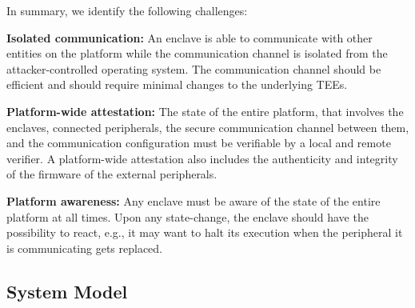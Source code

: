 In summary, we identify the following challenges:

\begin{mylist}

  \item \textbf{Isolated communication:} An enclave is able to communicate with other entities on the platform while the communication channel is isolated from the attacker-controlled operating system. The communication channel should be efficient and should require minimal changes to the underlying TEEs.
  
  \item \textbf{Platform-wide attestation:} The state of the entire platform, that involves the enclaves, connected peripherals, the secure communication channel between them, and the communication configuration must be verifiable by a local and remote verifier. A platform-wide attestation also includes the authenticity and integrity of the firmware of the external peripherals. 

  \item \textbf{Platform awareness:} Any enclave must be aware of the state of the entire platform at all times. Upon any state-change, the enclave should have the possibility to react, e.g., it may want to halt its execution when the peripheral it is communicating gets replaced. %

\end{mylist}







\subsection{System Model}
\label{sec:problemStatement:systemModel}

